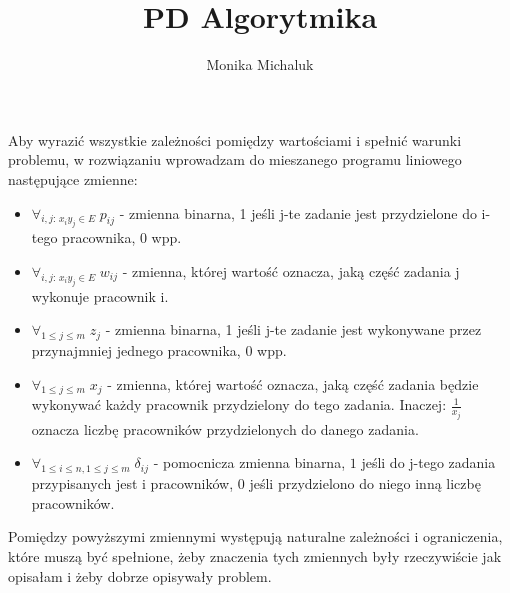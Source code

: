 \documentclass{article}
\title{PD Algorytmika}
\author{Monika Michaluk}
\begin{document}
\maketitle

Aby wyrazić wszystkie zależności pomiędzy wartościami i spełnić warunki problemu, w rozwiązaniu wprowadzam do mieszanego programu liniowego następujące zmienne:
\begin{itemize}
    \item  $\forall_{i,j:\, x_iy_j \in E} \; p_{ij}$ - zmienna binarna, 1 jeśli j-te zadanie jest przydzielone do i-tego pracownika, 0 wpp.
    \item  $\forall_{i,j:\, x_iy_j \in E} \; w_{ij}$ - zmienna, której wartość oznacza, jaką część zadania j wykonuje pracownik i.
    \item  $\forall_{1 \leq j \leq m} \; z_{j}$ - zmienna binarna, 1 jeśli j-te zadanie jest wykonywane przez przynajmniej jednego pracownika, 0 wpp.
    \item $\forall_{1 \leq j \leq m} \; x_{j}$ - zmienna, której wartość oznacza, jaką część zadania będzie wykonywać każdy pracownik przydzielony do tego zadania. Inaczej: $\frac{1}{x_j}$ oznacza liczbę pracowników przydzielonych do danego zadania.
    \item  $\forall_{1 \leq i \leq n, 1 \leq j \leq m} \; \delta_{ij}$ - pomocnicza zmienna binarna, $1$ jeśli do j-tego zadania przypisanych jest i pracowników, $0$ jeśli przydzielono do niego inną liczbę pracowników.

\end{itemize}

Pomiędzy powyższymi zmiennymi występują naturalne zależności i ograniczenia, które muszą być spełnione, żeby znaczenia tych zmiennych były rzeczywiście jak opisałam i żeby dobrze opisywały problem.
\end{document}
